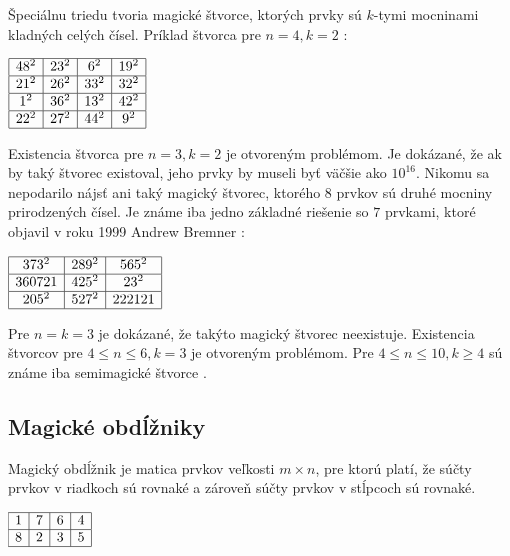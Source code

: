 Špeciálnu triedu tvoria magické štvorce, ktorých prvky sú $k$-tymi mocninami kladných celých čísel. Príklad štvorca pre $n = 4, k = 2$ \cite{multimagie}:

\begin{center}
$\begin{array}{ |c|c|c|c| } 
\hline
48^2 & 23^2 & 6^2 & 19^2 \\ 
\hline
21^2 & 26^2 & 33^2 & 32^2 \\ 
\hline
1^2 & 36^2 & 13^2 & 42^2 \\
\hline
22^2 & 27^2 & 44^2 & 9^2 \\
\hline
\end{array}$
\end{center}

Existencia štvorca pre $n = 3, k = 2$ je otvoreným problémom. Je dokázané, že ak by taký štvorec existoval, jeho prvky by museli byť väčšie ako $10^{16}$. Nikomu sa nepodarilo nájsť ani taký magický štvorec, ktorého $8$ prvkov sú druhé mocniny prirodzených čísel. Je známe iba jedno základné riešenie so $7$ prvkami, ktoré objavil v roku 1999 Andrew Bremner \cite{multimagie}:

\begin{center}
$\begin{array}{ |c|c|c| } 
\hline
373^2 & 289^2 & 565^2 \\ 
\hline
360721 & 425^2 & 23^2 \\ 
\hline
205^2 & 527^2 & 222121 \\
\hline
\end{array}$
\end{center}

Pre $n = k = 3$ je dokázané, že takýto magický štvorec neexistuje. Existencia štvorcov pre $4 \leq n \leq 6, k = 3$ je otvoreným problémom. Pre $4 \leq n \leq 10, k \geq 4$ sú známe iba semimagické štvorce \cite{multimagie}.

\subsection{Magické obdĺžniky}
\begin{definition} Magický obdĺžnik je matica prvkov veľkosti $m \times n$, pre ktorú platí, že súčty prvkov v riadkoch sú rovnaké a zároveň súčty prvkov v stĺpcoch sú rovnaké.
\end{definition}

\begin{center}
$\begin{array}{ |c|c|c|c| } 
\hline
1 & 7 & 6 & 4 \\ 
\hline
8 & 2 & 3 & 5 \\
\hline
\end{array}$
\end{center}

